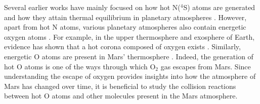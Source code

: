 \documentclass[fleqn,usenatbib]{mnras}
\begin{document}
Several earlier works have mainly focused on how hot N($^4$S) atoms are generated and how they attain thermal equilibrium in planetary atmospheres \citep{solomon1983possible, kharchenko1997kinetics, lie1991kinetics, gerard1991non, sharma1996production}. However, apart from hot N atoms, various planetary atmospheres also contain energetic oxygen atoms \citep{https://doi.org/10.1002/2015JE004890}. For example, in the upper thermosphere and exosphere of Earth, evidence has shown that a hot corona composed of oxygen exists \citep{oliver1997hot, bisikalo1995kinetic, hickey1995new, yee1980detection}. Similarly, energetic O atoms are present in Mars' thermosphere \citep{https://doi.org/10.1029/2009JE003388}. Indeed, the generation of hot O atoms is one of the ways through which O$_2$ gas escapes from Mars. Since understanding the escape of oxygen provides insights into how the atmosphere of Mars has changed over time, it is beneficial to study the collision reactions between hot O atoms and other molecules present in the Mars atmosphere.
\end{document}
